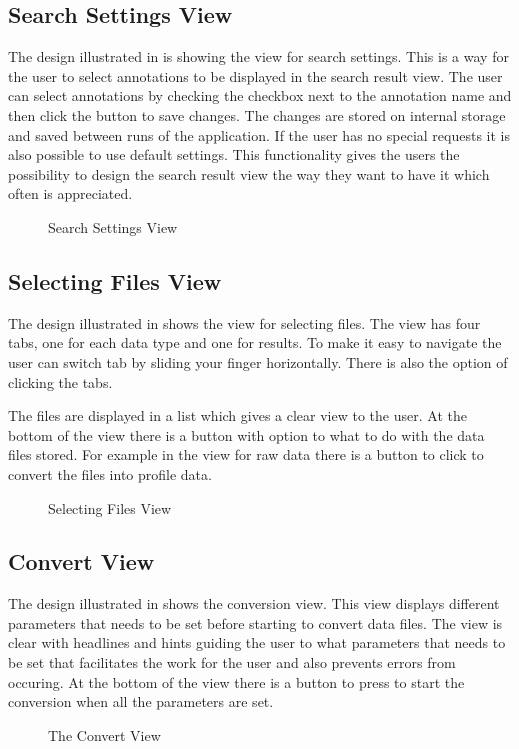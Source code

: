 \subsection{Search Settings View}
The design illustrated in  is showing the view for search settings. This is a way for the user to select annotations to be displayed in the search result view. The user can select annotations by checking the checkbox next to the annotation name and then click the button to save changes. The changes are stored on internal storage and saved between runs of the application. If the user has no special requests it is also possible to use default settings. This functionality gives the users the possibility to design the search result view the way they want to have it which often is appreciated. 

\begin{figure}[ht]
\caption{Search Settings View}
\label{fig:and_search_settings}
\end{figure}
\FloatBarrier

\subsection{Selecting Files View}
The design illustrated in  shows the view for selecting files. The view has four tabs, one for each data type and one for results. To make it easy to navigate the user can switch tab by sliding your finger horizontally. There is also the option of clicking the tabs. 

The files are displayed in a list which gives a clear view to the user. At the bottom of the view there is a button with option to what to do with the data files stored. For example in the view for raw data there is a button to click to convert the files into profile data.

\begin{figure}[h]
\caption{Selecting Files View}
\label{fig:and_selected}
\end{figure}
\FloatBarrier

\subsection{Convert View}
The design illustrated in  shows the conversion view. This view displays different parameters that needs to be set before starting to convert data files. The view is clear with headlines and hints guiding the user to what parameters that needs to be set that facilitates the work for the user and also prevents errors from occuring. At the bottom of the view there is a button to press to start the conversion when all the parameters are set. 

\begin{figure}[h]
\caption{The Convert View}
\label{fig:and_convert_man} 
\end{figure}
\FloatBarrier
